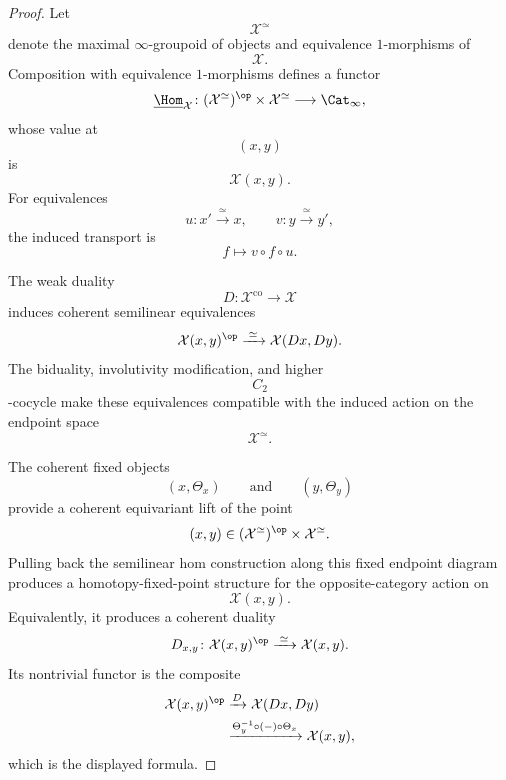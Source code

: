 \begin{proof}
Let
\[
    \mathcal X^\simeq
\]
denote the maximal $\infty$-groupoid of objects and equivalence
$1$-morphisms of
\[
    \mathcal X.
\]
Composition with equivalence $1$-morphisms defines a functor
\[
    \underline{\Hom}_{\mathcal X}
    \colon
    (\mathcal X^\simeq)^{\op}
    \times
    \mathcal X^\simeq
    \longrightarrow
    \Cat_\infty,
\]
whose value at
\[
    (x,y)
\]
is
\[
    \mathcal X(x,y).
\]
For equivalences
\[
    u
    \colon
    x'
    \xrightarrow{\;\simeq\;}
    x,
    \qquad
    v
    \colon
    y
    \xrightarrow{\;\simeq\;}
    y',
\]
the induced transport is
\[
    f
    \longmapsto
    v\circ f\circ u.
\]

The weak duality
\[
    D
    \colon
    \mathcal X^{\mathrm{co}}
    \longrightarrow
    \mathcal X
\]
induces coherent semilinear equivalences
\[
    \mathcal X(x,y)^{\op}
    \xrightarrow{\;\simeq\;}
    \mathcal X(Dx,Dy).
\]
The biduality, involutivity modification, and higher
\[
    C_2
\]
-cocycle make these equivalences compatible with the induced action on
the endpoint space
\[
    \mathcal X^\simeq.
\]

The coherent fixed objects
\[
    (x,\Theta_x)
    \qquad\text{and}\qquad
    (y,\Theta_y)
\]
provide a coherent equivariant lift of the point
\[
    (x,y)
    \in
    (\mathcal X^\simeq)^{\op}
    \times
    \mathcal X^\simeq.
\]
Pulling back the semilinear hom construction along this fixed endpoint
diagram produces a homotopy-fixed-point structure for the
opposite-category action on
\[
    \mathcal X(x,y).
\]
Equivalently, it produces a coherent duality
\[
    D_{x,y}
    \colon
    \mathcal X(x,y)^{\op}
    \xrightarrow{\;\simeq\;}
    \mathcal X(x,y).
\]
Its nontrivial functor is the composite
\[
\begin{aligned}
    \mathcal X(x,y)^{\op}
    &\xrightarrow{D}
    \mathcal X(Dx,Dy)
    \\
    &\xrightarrow{
        \Theta_y^{-1}\circ(-)\circ\Theta_x
    }
    \mathcal X(x,y),
\end{aligned}
\]
which is the displayed formula.


\end{proof}
